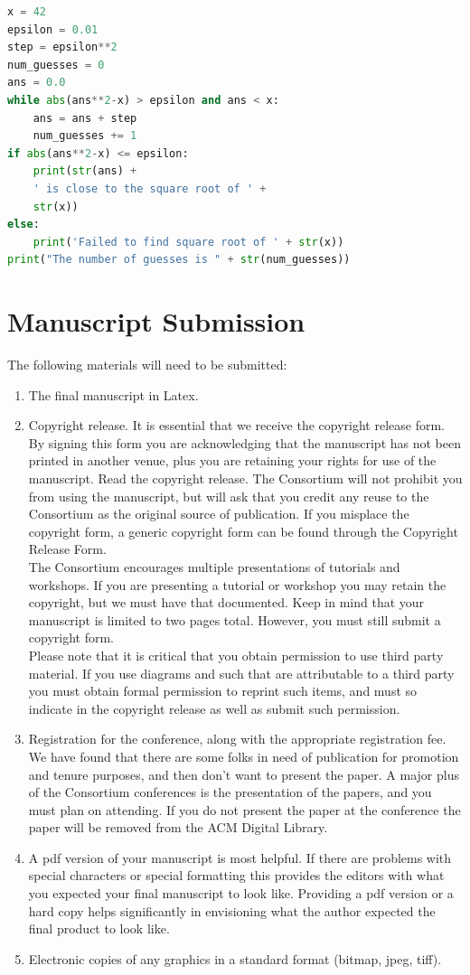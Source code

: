 \documentclass{article}
\begin{document}
\begin{lstlisting}[language=Python,  caption=Python example]
x = 42
epsilon = 0.01
step = epsilon**2
num_guesses = 0
ans = 0.0
while abs(ans**2-x) > epsilon and ans < x:
    ans = ans + step
    num_guesses += 1
if abs(ans**2-x) <= epsilon:
    print(str(ans) +
    ' is close to the square root of ' +
    str(x))
else:
    print('Failed to find square root of ' + str(x))
print("The number of guesses is " + str(num_guesses))
\end{lstlisting}

\section{Manuscript Submission}
The following materials will need to be submitted:
\begin{enumerate}[noitemsep]
  \item The final manuscript in Latex.
  \item Copyright release. It is essential that we receive the copyright
  release form. By signing this form you are acknowledging that the manuscript
  has not been printed in another venue, plus you are retaining your rights for
  use of the manuscript. Read the copyright release. The Consortium will not
  prohibit you from using the manuscript, but will ask that you credit any reuse
  to the Consortium as the original source of publication. If you misplace the
  copyright form, a generic copyright form can be found through the Copyright
  Release Form\cite{copyright}.\\
  The Consortium encourages multiple presentations of tutorials and workshops.
  If you are presenting a tutorial or workshop you may retain the copyright,
  but we must have that documented. Keep in mind that your manuscript is limited
  to two pages total. However, you must still submit a copyright form.\\
  Please note that it is critical that you obtain permission to use third party
  material. If you use diagrams and such that are attributable to a third party
  you must obtain formal permission to reprint such items, and must so indicate
  in the copyright release as well as submit such permission.
  \item Registration for the conference, along with the appropriate registration
  fee. We have found that there are some folks in need of publication for
  promotion and tenure purposes, and then don’t want to present the paper.
  A major plus of the Consortium conferences is the presentation of the papers,
  and you must plan on attending. If you do not present the paper at the
  conference the paper will be removed from the ACM Digital Library.
  \item A pdf version of your manuscript is most helpful. If there are problems
  with special characters or special formatting this provides the editors with
  what you expected your final manuscript to look like. Providing a pdf version
  or a hard copy helps significantly in envisioning what the author expected
  the final product to look like.
  \item Electronic copies of any graphics in a standard format (bitmap, jpeg, tiff).
\end{enumerate}
\end{document}
